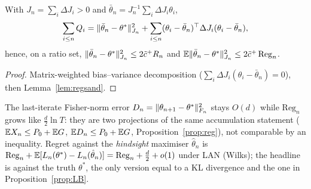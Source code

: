 \begin{lemma}\label{lem:avgerr}\Pt{}
With $J_n=\sum_i\Delta J_i>0$ and $\bar\theta_n=J_n^{-1}\sum_i\Delta J_i\theta_i$,
\[
\sum_{i\le n}Q_i=\lVert \bar\theta_n-\theta^*\rVert^2_{J_n}+\sum_{i\le n}(\theta_i-\bar\theta_n)^{\top}\Delta J_i(\theta_i-\bar\theta_n),
\]
hence, on a ratio set, $\lVert \bar\theta_n-\theta^*\rVert_{J_n}^2\le2\tilde c^{+}R_n$ and $\mathbb{E}\lVert \bar\theta_n-\theta^*\rVert^2_{J_n}\le2\tilde c^{+}\,\mathrm{Reg}_n$.
\end{lemma}
\begin{proof}
Matrix-weighted bias--variance decomposition ($\sum_i\Delta J_i(\theta_i-\bar\theta_n)=0$), then Lemma~\ref{lem:regsand}.
\end{proof}

\begin{remark}
The last-iterate Fisher-norm error $D_n=\lVert \theta_{n+1}-\theta^*\rVert_{F_n}^2$ stays $O(d)$ while $\mathrm{Reg}_n$ grows like $\tfrac d2\ln T$: they are two projections of the same accumulation statement ($\mathbb{E} X_n\le P_0+\mathbb{E} G$, $\mathbb{E} D_n\le P_0+\mathbb{E} G$, Proposition~\ref{prop:reg}), not comparable by an inequality. Regret against the \emph{hindsight} maximiser $\hat\theta_n$ is $\mathrm{Reg}_n+\mathbb{E}[L_n(\theta^*)-L_n(\hat\theta_n)]=\mathrm{Reg}_n+\tfrac d2+o(1)$ under LAN (Wilks); the headline is against the truth $\theta^*$, the only version equal to a KL divergence and the one in Proposition~\ref{prop:LB}.
\end{remark}
